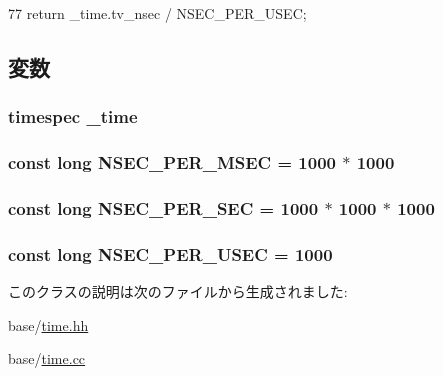 \begin{DoxyCode}
77 { return _time.tv_nsec / NSEC_PER_USEC; }
\end{DoxyCode}


\subsection{変数}
\hypertarget{classTime_add42e751e54ea2991eda24784f271e51}{
\subsubsection[{\_\-time}]{\setlength{\rightskip}{0pt plus 5cm}timespec {\bf \_\-time}}}
\label{classTime_add42e751e54ea2991eda24784f271e51}
\hypertarget{classTime_a834c9f01d049ca7566760e3e176bebd3}{
\subsubsection[{NSEC\_\-PER\_\-MSEC}]{\setlength{\rightskip}{0pt plus 5cm}const long {\bf NSEC\_\-PER\_\-MSEC} = 1000 $\ast$ 1000}}
\label{classTime_a834c9f01d049ca7566760e3e176bebd3}
\hypertarget{classTime_acf39b97318b2d461688089128187619b}{
\subsubsection[{NSEC\_\-PER\_\-SEC}]{\setlength{\rightskip}{0pt plus 5cm}const long {\bf NSEC\_\-PER\_\-SEC} = 1000 $\ast$ 1000 $\ast$ 1000}}
\label{classTime_acf39b97318b2d461688089128187619b}
\hypertarget{classTime_a96e26292451055de6e9acb621fe78dfc}{
\subsubsection[{NSEC\_\-PER\_\-USEC}]{\setlength{\rightskip}{0pt plus 5cm}const long {\bf NSEC\_\-PER\_\-USEC} = 1000}}
\label{classTime_a96e26292451055de6e9acb621fe78dfc}


このクラスの説明は次のファイルから生成されました:\begin{DoxyCompactItemize}
\item 
base/\hyperlink{time_8hh}{time.hh}\item 
base/\hyperlink{time_8cc}{time.cc}\end{DoxyCompactItemize}
